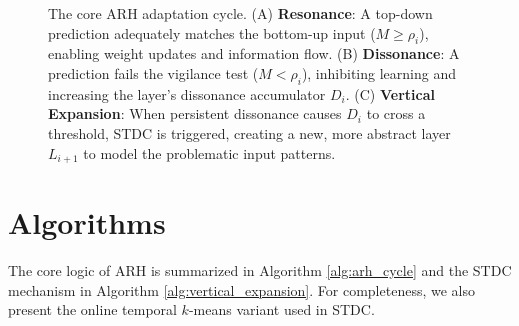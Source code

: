\documentclass{article}
\numberwithin{figure}{section}
\numberwithin{table}{section}
\numberwithin{algorithm}{section}
\begin{document}
\begin{figure}[h]
    \caption{The core ARH adaptation cycle. (A) \textbf{Resonance}: A top-down prediction adequately matches the bottom-up input ($M \ge \rho_i$), enabling weight updates and information flow. (B) \textbf{Dissonance}: A prediction fails the vigilance test ($M < \rho_i$), inhibiting learning and increasing the layer's dissonance accumulator $D_i$. (C) \textbf{Vertical Expansion}: When persistent dissonance causes $D_i$ to cross a threshold, STDC is triggered, creating a new, more abstract layer $L_{i+1}$ to model the problematic input patterns.}
    \label{fig:arh_diagram}
\end{figure}

\section{Algorithms}
The core logic of ARH is summarized in Algorithm \ref{alg:arh_cycle} and the STDC mechanism in Algorithm \ref{alg:vertical_expansion}. For completeness, we also present the online temporal $k$-means variant used in STDC.
\end{document}
